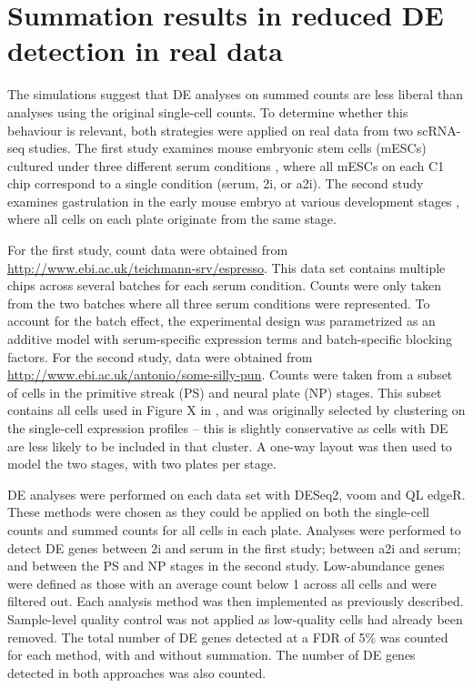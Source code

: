 \documentclass[oupdraft]{bio}
\begin{document}
\section{Summation results in reduced DE detection in real data}
The simulations suggest that DE analyses on summed counts are less liberal than analyses using the original single-cell counts.
To determine whether this behaviour is relevant, both strategies were applied on real data from two scRNA-seq studies.
The first study examines mouse embryonic stem cells (mESCs) cultured under three different serum conditions \citep{kolod2015single},
    where all mESCs on each C1 chip correspond to a single condition (serum, 2i, or a2i).
The second study examines gastrulation in the early mouse embryo at various development stages \citep{scialdone2015single},
    where all cells on each plate originate from the same stage.

For the first study, count data were obtained from \url{http://www.ebi.ac.uk/teichmann-srv/espresso}. 
This data set contains multiple chips across several batches for each serum condition.
Counts were only taken from the two batches where all three serum conditions were represented.
To account for the batch effect, the experimental design was parametrized as an additive model with serum-specific expression terms and batch-specific blocking factors.
For the second study, data were obtained from \url{http://www.ebi.ac.uk/antonio/some-silly-pun}.
Counts were taken from a subset of cells in the primitive streak (PS) and neural plate (NP) stages.
This subset contains all cells used in Figure X in \cite{scialdone2015single}, and was originally selected by clustering on the single-cell expression profiles 
    -- this is slightly conservative as cells with DE are less likely to be included in that cluster.
A one-way layout was then used to model the two stages, with two plates per stage.


DE analyses were performed on each data set with DESeq2, voom and QL edgeR.
These methods were chosen as they could be applied on both the single-cell counts and summed counts for all cells in each plate. 
Analyses were performed to detect DE genes between 2i and serum in the first study; between a2i and serum; and between the PS and NP stages in the second study.
Low-abundance genes were defined as those with an average count below 1 across all cells and were filtered out.
Each analysis method was then implemented as previously described. 
Sample-level quality control was not applied as low-quality cells had already been removed.
The total number of DE genes detected at a FDR of 5\% was counted for each method, with and without summation.
The number of DE genes detected in both approaches was also counted.
\end{document}
